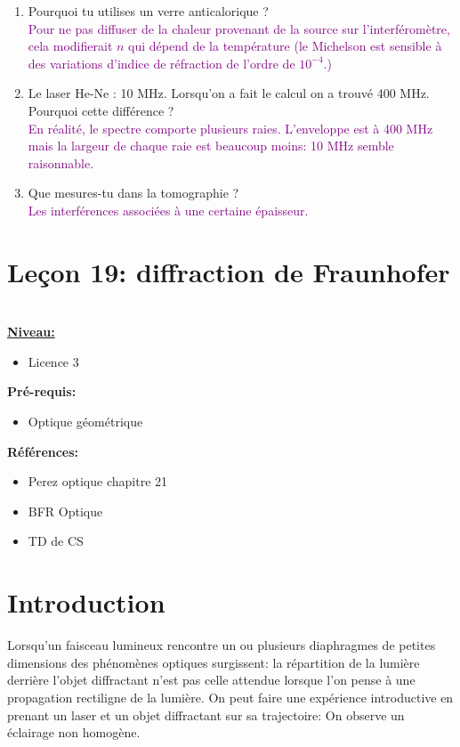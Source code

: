 \documentclass[french, a4paper, 10pt, twocolumn, landscape]{article}
\begin{document}
{\begin{enumerate}
  \item Pourquoi tu utilises un verre anticalorique ? \\
  \textcolor{purple}{Pour ne pas diffuser de la chaleur provenant de la source sur l'interféromètre, cela modifierait $n$ qui dépend de la température (le Michelson est sensible à des variations d'indice de réfraction de l'ordre de $10^{-4}$.)}
     
  \item Le laser He-Ne : 10 MHz. Lorsqu'on a fait le calcul on a trouvé 400 MHz. Pourquoi cette différence ? \\
     \textcolor{purple}{En réalité, le spectre comporte plusieurs raies. L'enveloppe est à 400 MHz mais la largeur de chaque raie est beaucoup moins: 10 MHz semble raisonnable.}

     
  \item Que mesures-tu dans la tomographie ? \\
     \textcolor{purple}{Les interférences associées à une certaine épaisseur.}
    
\end{enumerate}
}

\clearpage

\section*{Leçon 19: diffraction de Fraunhofer}

\hrulefill\\

\noindent\underline{\textbf{Niveau:}} 
\begin{itemize}
    \item Licence 3
\end{itemize}

\textbf{Pré-requis:}
\begin{itemize}
    \item Optique géométrique
\end{itemize}

\textbf{Références:}\medskip

\begin{itemize}
\item Perez optique chapitre 21
\item BFR Optique
\item TD de CS
\end{itemize}

\hrulefill

\section*{Introduction}
Lorsqu'un faisceau lumineux rencontre un ou plusieurs diaphragmes de petites dimensions des phénomènes optiques surgissent: la répartition de la lumière derrière l'objet diffractant n'est pas celle attendue lorsque l'on pense à une propagation rectiligne de la lumière. On peut faire une expérience introductive en prenant un laser et un objet diffractant sur sa trajectoire: On observe un éclairage non homogène. 
\end{document}
